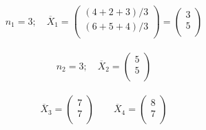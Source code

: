 \documentclass[11pt,a4paper]{article}
\theoremstyle{definition}
\begin{document}
$$n_1=3;\quad  \overline{X}_1=\begin{pmatrix}
(4+2+3)/3\\ (6+5+4)/3\\
\end{pmatrix}=
\begin{pmatrix}
3\\ 5\\
\end{pmatrix}
$$\\

$$n_2=3;\quad  \overline{X}_2=
\begin{pmatrix}
5\\ 5\\
\end{pmatrix}
$$\\


$$\overline{X}_3=
\begin{pmatrix}
7\\7\\
\end{pmatrix}
\qquad 
\overline{X}_4=
\begin{pmatrix}
8\\ 7\\
\end{pmatrix}
$$\\
\end{document}

